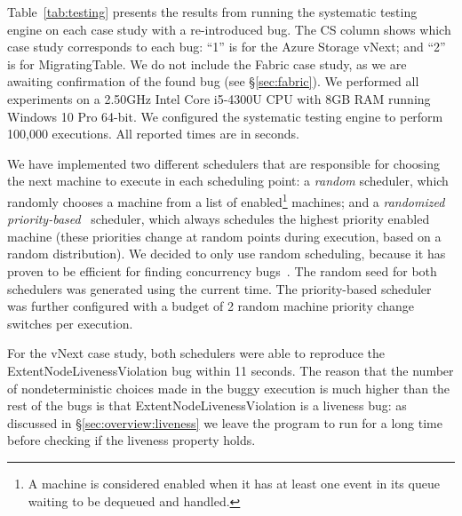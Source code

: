 Table~\ref{tab:testing} presents the results from running the \psharp systematic testing engine on each case study with a re-introduced bug. The CS column shows which case study corresponds to each bug: ``1'' is for the Azure Storage vNext; and ``2'' is for MigratingTable. We do not include the Fabric case study, as we are awaiting confirmation of the found bug (see \S\ref{sec:fabric}). We performed all experiments on a 2.50GHz Intel Core i5-4300U CPU with 8GB RAM running Windows 10 Pro 64-bit. We configured the \psharp systematic testing engine to perform 100,000 executions. All reported times are in seconds.

We have implemented two different schedulers that are responsible for choosing the next \psharp machine to execute in each scheduling point: a \emph{random} scheduler, which randomly chooses a machine from a list of enabled\footnote{A \psharp machine is considered enabled when it has at least one event in its queue waiting to be dequeued and handled.} machines; and a \emph{randomized priority-based}~\cite{burckhardt2010pct} scheduler, which always schedules the highest priority enabled machine (these priorities change at random points during execution, based on a random distribution). We decided to only use random scheduling, because it has proven to be efficient for finding concurrency bugs~\cite{thomson2014sct, deligiannis2015psharp}.
The random seed for both schedulers was generated using the current time. The priority-based scheduler was further configured with a budget of 2 random machine priority change switches per execution.

For the vNext case study, both schedulers were able to reproduce the ExtentNodeLivenessViolation bug within 11 seconds. The reason that the number of nondeterministic choices made in the buggy execution is much higher than the rest of the bugs is that ExtentNodeLivenessViolation is a liveness bug: as discussed in \S\ref{sec:overview:liveness} we leave the program to run for a long time before checking if the liveness property holds.

